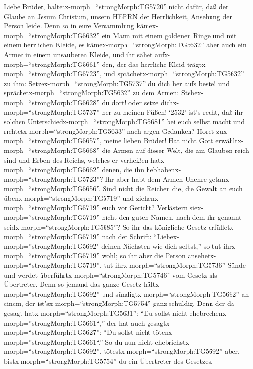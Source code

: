  Liebe Brüder, haltetx-morph=``strongMorph:TG5720'' nicht
dafür, daß der Glaube an Jesum Christum, unsern HERRN der Herrlichkeit,
Ansehung der Person leide.  Denn so in eure Versammlung
kämex-morph=``strongMorph:TG5632'' ein Mann mit einem goldenen Ringe und
mit einem herrlichen Kleide, es kämex-morph=``strongMorph:TG5632'' aber
auch ein Armer in einem unsauberen Kleide,  und ihr sähet
aufx-morph=``strongMorph:TG5661'' den, der das herrliche Kleid
trägtx-morph=``strongMorph:TG5723'', und
sprächetx-morph=``strongMorph:TG5632'' zu ihm:
Setzex-morph=``strongMorph:TG5737'' du dich her aufs beste! und
sprächetx-morph=``strongMorph:TG5632'' zu dem Armen:
Stehex-morph=``strongMorph:TG5628'' du dort! oder setze
dichx-morph=``strongMorph:TG5737'' her zu meinen Füßen! 
`2532' ist's recht, daß ihr solchen
Unterschiedx-morph=``strongMorph:TG5681'' bei euch selbst macht und
richtetx-morph=``strongMorph:TG5633'' nach argen Gedanken? 
Höret zux-morph=``strongMorph:TG5657'', meine lieben Brüder! Hat nicht
Gott erwähltx-morph=``strongMorph:TG5668'' die Armen auf dieser Welt,
die am Glauben reich sind und Erben des Reichs, welches er verheißen
hatx-morph=``strongMorph:TG5662'' denen, die ihn
liebhabenx-morph=``strongMorph:TG5723''?  Ihr aber habt dem
Armen Unehre getanx-morph=``strongMorph:TG5656''. Sind nicht die Reichen
die, die Gewalt an euch übenx-morph=``strongMorph:TG5719'' und
ziehenx-morph=``strongMorph:TG5719'' euch vor Gericht? 
Verlästern siex-morph=``strongMorph:TG5719'' nicht den guten Namen, nach
dem ihr genannt seidx-morph=``strongMorph:TG5685''?  So ihr
das königliche Gesetz erfülletx-morph=``strongMorph:TG5719'' nach der
Schrift: ``Liebex-morph=''strongMorph:TG5692" deinen Nächsten wie dich
selbst,'' so tut ihrx-morph=``strongMorph:TG5719'' wohl;  so
ihr aber die Person ansehetx-morph=``strongMorph:TG5719'', tut
ihrx-morph=``strongMorph:TG5736'' Sünde und werdet
überführtx-morph=``strongMorph:TG5746'' vom Gesetz als Übertreter.
 Denn so jemand das ganze Gesetz
hältx-morph=``strongMorph:TG5692'' und
sündigtx-morph=``strongMorph:TG5692'' an einem, der
ist'sx-morph=``strongMorph:TG5754'' ganz schuldig.  Denn
der da gesagt hatx-morph=``strongMorph:TG5631'': ``Du sollst nicht
ehebrechenx-morph=''strongMorph:TG5661``,'' der hat auch
gesagtx-morph=``strongMorph:TG5627'': ``Du sollst nicht
tötenx-morph=''strongMorph:TG5661``.'' So du nun nicht
ehebrichstx-morph=``strongMorph:TG5692'',
tötestx-morph=``strongMorph:TG5692'' aber,
bistx-morph=``strongMorph:TG5754'' du ein Übertreter des Gesetzes.
